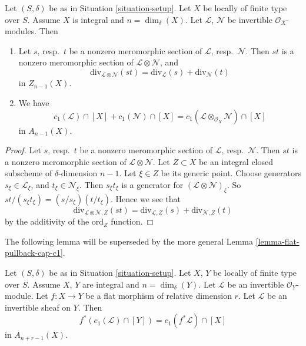 \begin{lemma}
\label{lemma-c1-additive}
Let $(S, \delta)$ be as in Situation \ref{situation-setup}.
Let $X$ be locally of finite type over $S$. Assume $X$ is
integral and $n = \dim_\delta(X)$.
Let $\mathcal{L}$, $\mathcal{N}$ be invertible $\mathcal{O}_X$-modules.
Then
\begin{enumerate}
\item Let $s$, resp.\ $t$ be a nonzero meromorphic section
of $\mathcal{L}$, resp.\ $\mathcal{N}$. Then $st$ is a nonzero
meromorphic section of $\mathcal{L} \otimes \mathcal{N}$, and
$$
\text{div}_{\mathcal{L} \otimes \mathcal{N}}(st)
=
\text{div}_\mathcal{L}(s) + \text{div}_\mathcal{N}(t)
$$
in $Z_{n - 1}(X)$.
\item We have
$$
c_1(\mathcal{L}) \cap [X] + c_1(\mathcal{N}) \cap [X] =
c_1(\mathcal{L} \otimes_{\mathcal{O}_X} \mathcal{N}) \cap [X]
$$
in $A_{n - 1}(X)$.
\end{enumerate}
\end{lemma}

\begin{proof}
Let $s$, resp.\ $t$ be a nonzero meromorphic section
of $\mathcal{L}$, resp.\ $\mathcal{N}$. Then $st$ is a nonzero
meromorphic section of $\mathcal{L} \otimes \mathcal{N}$.
Let $Z \subset X$ be an integral closed subscheme of
$\delta$-dimension $n - 1$. Let $\xi \in Z$ be its generic
point. Choose generators $s_\xi \in \mathcal{L}_\xi$, and
$t_\xi \in \mathcal{N}_\xi$. Then $s_\xi t_\xi$ is a generator
for $(\mathcal{L} \otimes \mathcal{N})_\xi$.
So $st/(s_\xi t_\xi) = (s/s_\xi)(t/t_\xi)$.
Hence we see that
$$
\text{div}_{\mathcal{L} \otimes \mathcal{N}, Z}(st)
=
\text{div}_{\mathcal{L}, Z}(s) + \text{div}_{\mathcal{N}, Z}(t)
$$
by the additivity of the $\text{ord}_Z$ function.
\end{proof}

\noindent
The following lemma will be superseded by the more general
Lemma \ref{lemma-flat-pullback-cap-c1}.

\begin{lemma}
\label{lemma-flat-pullback-divisor-invertible-sheaf}
Let $(S, \delta)$ be as in Situation \ref{situation-setup}.
Let $X$, $Y$ be locally of finite type over $S$. Assume $X$, $Y$
are integral and $n = \dim_\delta(Y)$.
Let $\mathcal{L}$ be an invertible $\mathcal{O}_Y$-module.
Let $f : X \to Y$ be a flat morphism of relative dimension $r$.
Let $\mathcal{L}$ be an invertible sheaf on $Y$. Then
$$
f^*(c_1(\mathcal{L}) \cap [Y]) = c_1(f^*\mathcal{L}) \cap [X]
$$
in $A_{n + r - 1}(X)$.
\end{lemma}

